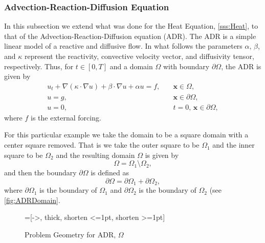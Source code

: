 \subsubsection{Advection-Reaction-Diffusion Equation} \label{sss:ADR}
    In this subsection we extend what was done for the Heat Equation,
    \autoref{sss:Heat}, to that of the Advection-Reaction-Diffusion equation
    (ADR). The ADR is a simple linear model of a reactive and diffusive flow. In
    what follows the parameters $\alpha,\,\beta$, and $\kappa$ represent the
    reactivity, convective velocity vector, and diffusivity tensor,
    respectively. Thus, for $t\in [0,T]$ and a domain $\Omega$ with boundary
    $\partial \Omega$, the ADR is given by
    \begin{equation}
        \begin{split}
            u_t + \nabla \left(\kappa\cdot \nabla u \right) + \beta \cdot \nabla
                u + \alpha u = f,& \quad \mathbf{x} \in \Omega, \\
            u = g,& \quad \mathbf{x} \in \partial \Omega, \\
            u = 0,& \quad t = 0,\, \mathbf{x} \in \partial \Omega,
        \end{split}
        \label{eq:ADR}
    \end{equation}
    where $f$ is the external forcing.

    For this particular example we take the domain to be a square domain with a
    center square removed. That is we take the outer square to be $\Omega_1$ and
    the inner square to be $\Omega_2$ and the resulting domain $\Omega$ is given
    by
    \begin{equation}
        \Omega = \Omega_1\setminus \Omega_2,
        \label{eq:ADRDomain}
    \end{equation}
    and then the boundary $\partial \Omega$ is defined as
    \begin{equation}
        \partial \Omega = \partial \Omega_1 + \partial \Omega_2,
        \label{eq:ADRBoundary}
    \end{equation}
    where $\partial \Omega_1$ is the boundary of $\Omega_1$ and $\partial
    \Omega_2$ is the boundary of $\Omega_2$ (see \autoref{fig:ADRDomain}.

    \begin{figure}[H]
        \centering
        =[->, thick, shorten <=1pt, shorten >=1pt]
        \caption{Problem Geometry for ADR, $\Omega$}
        \label{fig:ADRDomain}
    \end{figure}

